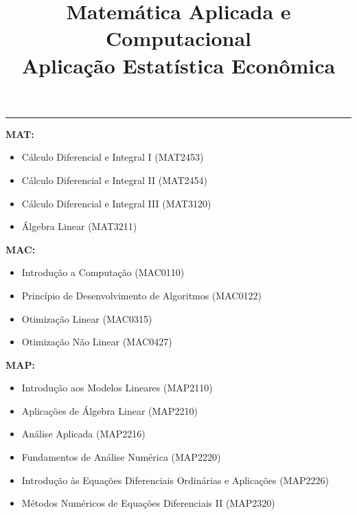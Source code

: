 \documentclass[12pt, a4paper]{article}
\title{\textbf{Matemática Aplicada e Computacional} \\ \large Aplicação Estatística Econômica}
\date{}
\begin{document}
\maketitle
\thispagestyle{empty}

\hrule
\vspace{0.5cm}

\noindent\textbf{MAT:}
\begin{itemize}[leftmargin=2.5cm, topsep=2pt, itemsep=2pt]
    \item Cálculo Diferencial e Integral I \hfill (MAT2453)
    \item Cálculo Diferencial e Integral II \hfill (MAT2454)
    \item Cálculo Diferencial e Integral III \hfill (MAT3120)
    \item Álgebra Linear \hfill (MAT3211)
\end{itemize}

\vspace{0.4cm}

\noindent\textbf{MAC:}
\begin{itemize}[leftmargin=2.5cm, topsep=2pt, itemsep=2pt]
    \item Introdução a Computação \hfill (MAC0110)
    \item Princípio de Desenvolvimento de Algoritmos \hfill (MAC0122)
    \item Otimização Linear \hfill (MAC0315)
    \item Otimização Não Linear \hfill (MAC0427)
\end{itemize}

\vspace{0.4cm}

\noindent\textbf{MAP:}
\begin{itemize}[leftmargin=2.5cm, topsep=2pt, itemsep=2pt]
    \item Introdução aos Modelos Lineares \hfill (MAP2110)
    \item Aplicações de Álgebra Linear \hfill (MAP2210)
    \item Análise Aplicada \hfill (MAP2216)
    \item Fundamentos de Análise Numérica \hfill (MAP2220)
    \item Introdução às Equações Diferenciais Ordinárias e Aplicações \hfill (MAP2226)
    \item Métodos Numéricos de Equações Diferenciais II \hfill (MAP2320)
\end{itemize}

\vspace{0.4cm}
\end{document}
